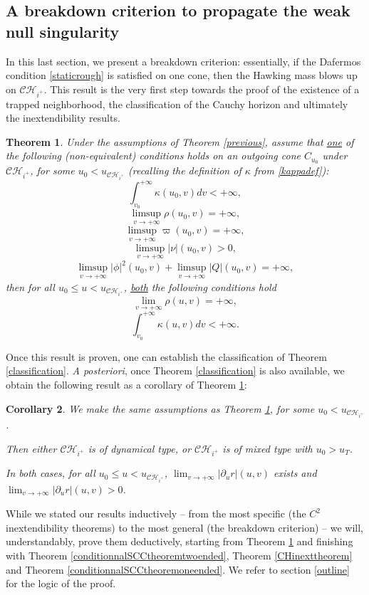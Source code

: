 \documentclass[10pt,a4paper]{article}
\theoremstyle{plain}
\newtheorem{thm}{Theorem}[section]
\newtheorem{cor}[thm]{Corollary}
\theoremstyle{remark}
\theoremstyle{definition}
\theoremstyle{plain}
\theoremstyle{remark}
\theoremstyle{definition}
\newcommand{\CH}{\mathcal{CH}_{i^+}}
\numberwithin{equation}{section}
\begin{document}
\subsection{A breakdown criterion to propagate the weak null singularity} In this last section, we present a breakdown criterion: essentially, if the Dafermos condition \eqref{staticrough} is satisfied on one cone, then the Hawking mass blows up on $\CH$. This result is the very first step towards the proof of the existence of a trapped neighborhood, the classification of the Cauchy horizon and ultimately the inextendibility results.
\begin{thm} \label{propagationtheorem} Under the assumptions of Theorem \ref{previous}, assume that \underline{one} of the following (non-equivalent) conditions holds on an outgoing cone $C_{u_0}$ under $\CH$, for some $u_0 <u_{\CH}$ (recalling the definition of $\kappa$ from \eqref{kappadef}):
	$$\int_{v_0}^{+\infty} \kappa(u_0,v) dv <+\infty,$$
	$$\limsup_{v \rightarrow+\infty} \rho(u_0,v)=+\infty,$$
	$$\limsup_{v \rightarrow+\infty} \varpi(u_0,v)=+\infty,$$
	$$ \limsup_{v \rightarrow+\infty} |\nu|(u_0,v) >0,$$ 		$$\limsup_{v \rightarrow+\infty} |\phi|^2(u_0,v)+ \limsup_{v \rightarrow+\infty} |Q|(u_0,v)=+\infty,$$
	then for all $u_0 \leq u < u_{\CH}$, \underline{both} the following conditions hold
	$$\lim_{v \rightarrow+\infty} \rho(u,v)=+\infty,$$
	$$\int_{v_0}^{+\infty} \kappa(u,v)dv <+\infty.$$
	
\end{thm} Once this result is proven, one can establish the classification of Theorem \ref{classification}. \textit{A posteriori}, once Theorem \ref{classification} is also available, we obtain the following result as a corollary of Theorem \ref{propagationtheorem}:
\begin{cor} We make the same assumptions as Theorem \ref{propagationtheorem}, for some $u_0 <u_{\CH}$.
	
	Then either $\CH$ is of dynamical type, or $\CH$ is of mixed type with $u_0 > u_T$. 
	
	In both cases, for all $u_0 \leq u < u_{\CH}$, $ \lim_{v \rightarrow+\infty} |\partial_u r|(u,v)$ exists and $ \lim_{v \rightarrow+\infty} |\partial_u r|(u,v) >0$. 
\end{cor}

While we stated our results inductively -- from the most specific (the $C^2$ inextendibility theorems) to the most general (the breakdown criterion) -- we will, understandably, prove them deductively, starting from Theorem \ref{propagationtheorem} and finishing with Theorem \ref{conditionnalSCCtheoremtwoended}, Theorem \ref{CHinexttheorem} and Theorem \ref{conditionnalSCCtheoremoneended}. We refer to section \ref{outline} for the logic of the proof.
\end{document}
